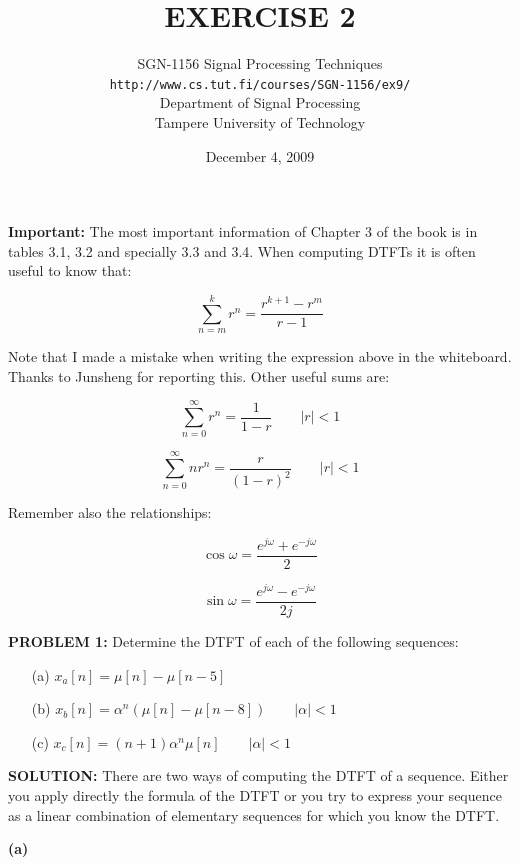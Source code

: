 \documentclass[a4paper,11pt,oneside]{article}
\title{\large{\textbf{EXERCISE 2}}}
\author{SGN-1156 Signal Processing Techniques\\
\texttt{http://www.cs.tut.fi/courses/SGN-1156/ex9/}\\
Department of Signal Processing\\
Tampere University of Technology}
\date{December 4, 2009}
\begin{document}
\maketitle


\textbf{Important:} The most important information of Chapter 3 of the book is in tables 3.1, 3.2 and specially 3.3 and 3.4. When computing DTFTs it is often useful to know that:

\[
\sum_{n=m}^{k}r^{n}=\frac{r^{k+1}-r^m}{r-1}
\]

Note that I made a mistake when writing the expression above in the whiteboard. Thanks to Junsheng for reporting this. Other useful sums are:

\[
\sum_{n=0}^{\infty} r^{n}=\frac{1}{1-r} \qquad |r|<1
\] 

\[
\sum_{n=0}^{\infty} nr^{n}=\frac{r}{(1-r)^2} \qquad |r|<1
\]

Remember also the relationships:

\[
\cos \omega = \frac{e^{j\omega}+e^{-j\omega}}{2}
\]

\[
\sin \omega = \frac{e^{j\omega}-e^{-j\omega}}{2j}
\]






\textbf{PROBLEM 1:} Determine the DTFT of each of the following sequences:

\begin{itemize}
\item[(a)] $x_a[n] = \mu[n]-\mu[n-5]$
\item[(b)] $x_b[n] = \alpha^n\left(\mu[n]-\mu[n-8]\right) \qquad |\alpha|< 1$
\item[(c)] $x_c[n] = (n+1)\alpha^n\mu[n] \qquad |\alpha|<1$
\end{itemize}  



\vspace{1cm}



\textbf{SOLUTION:}
There are two ways of computing the DTFT of a sequence. Either you apply directly the formula of the DTFT or you try to express your sequence as a linear combination of elementary sequences for which you know the DTFT. 

\vspace{.5cm}

\textbf{(a)}
\end{document}
